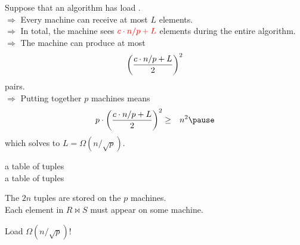 \documentclass{beamer}
\def\vgap{\vspace{5mm}}
\begin{document}
\begin{frame}
\begin{small}
    
    \vgap 
    
    
    Suppose that an algorithm has load . \\ \pause 
    $\Rightarrow$ Every machine can receive at most $L$ elements. \\ \pause
    $\Rightarrow$ In total, the machine sees $\textcolor{red}{c \cdot n/p + L}$ elements during the entire algorithm. \\ \pause 
    $\Rightarrow$ The machine can produce at most 
    \begin{eqnarray} 
        \left(\frac{c \cdot n/p + L}{2} \right)^2 \nonumber
    \end{eqnarray}
    pairs. \\ \pause 
    $\Rightarrow$ Putting together $p$ machines means
    \begin{eqnarray} 
        p \cdot \left(\fr{c \cdot n/p + L}{2} \right)^2 &\ge& n^2 \nn \pause
    \end{eqnarray}
    which solves to $L = \Omega(n / \sqrt{p})$.
\end{small}
\end{frame}
\begin{frame}
\begin{small}
    
    \vgap 
    
    
    
    \vgap
    
     a table of  tuples \\ 
     a table of  tuples \\ 

    \vgap 
    
     The $2n$ tuples are stored on the $p$ machines. \\ 
     Each element in $R \bowtie S$ must appear on some machine. 
    
    \vgap \vgap \pause
    
     Load $\Omega(n/\sqrt{p})$! 
\end{small}
\end{frame}
\end{document}
